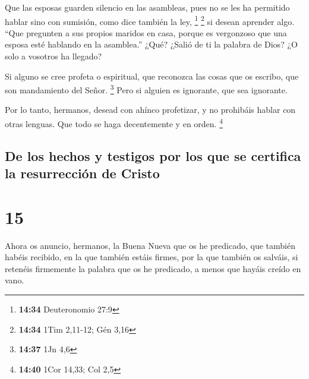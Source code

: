  Que las esposas guarden silencio en las asambleas, pues
no se les ha permitido hablar sino con sumisión, como dice también la
ley, \footnote{\textbf{14:34} Deuteronomio 27:9} \footnote{\textbf{14:34}
  1Tim 2,11-12; Gén 3,16}  si desean aprender algo. ``Que
pregunten a sus propios maridos en casa, porque es vergonzoso que una
esposa esté hablando en la asamblea.''  ¿Qué? ¿Salió de
ti la palabra de Dios? ¿O solo a vosotros ha llegado?

 Si alguno se cree profeta o espiritual, que reconozca
las cosas que os escribo, que son mandamiento del Señor. \footnote{\textbf{14:37}
  1Jn 4,6}  Pero si alguien es ignorante, que sea
ignorante.

 Por lo tanto, hermanos, desead con ahínco profetizar, y
no prohibáis hablar con otras lenguas.  Que todo se haga
decentemente y en orden. \footnote{\textbf{14:40} 1Cor 14,33; Col 2,5}

\hypertarget{de-los-hechos-y-testigos-por-los-que-se-certifica-la-resurrecciuxf3n-de-cristo}{%
\subsection{De los hechos y testigos por los que se certifica la
resurrección de
Cristo}\label{de-los-hechos-y-testigos-por-los-que-se-certifica-la-resurrecciuxf3n-de-cristo}}

\hypertarget{section-14}{%
\section{15}\label{section-14}}

 Ahora os anuncio, hermanos, la Buena Nueva que os he
predicado, que también habéis recibido, en la que también estáis firmes,
 por la que también os salváis, si retenéis firmemente la
palabra que os he predicado, a menos que hayáis creído en vano.

